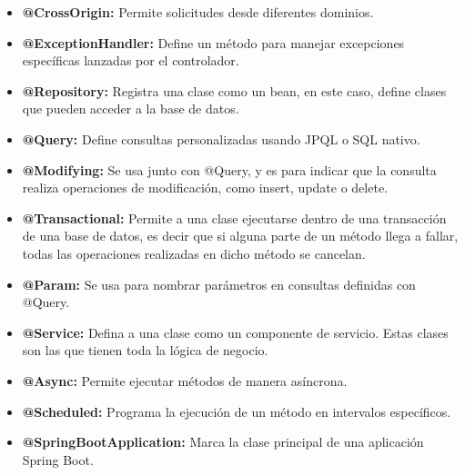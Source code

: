 \begin{itemize}
	\item \textbf{@CrossOrigin:} Permite solicitudes desde diferentes dominios. 
	\item \textbf{@ExceptionHandler:} Define un método para manejar excepciones específicas lanzadas por el controlador.
	\item \textbf{@Repository:} Registra una clase como un bean, en este caso, define clases que pueden acceder a la base de datos.
	\item \textbf{@Query:} Define consultas personalizadas usando JPQL o SQL nativo.
	\item \textbf{@Modifying:} Se usa junto con @Query, y es para indicar que la consulta realiza operaciones de modificación, como insert, update o delete.
	\item \textbf{@Transactional:} Permite a una clase ejecutarse dentro de una transacción de una base de datos, es decir que si alguna parte de un método llega a fallar, todas las operaciones realizadas en dicho método se cancelan.
	\item \textbf{@Param:} Se usa para nombrar parámetros en consultas definidas con @Query.
	\item \textbf{@Service:} Defina a una clase como un componente de servicio. Estas clases son las que tienen toda la lógica de negocio.
	\item \textbf{@Async:} Permite ejecutar métodos de manera asíncrona.
	\item \textbf{@Scheduled:} Programa la ejecución de un método en intervalos específicos.
	\item \textbf{@SpringBootApplication:} Marca la clase principal de una aplicación Spring Boot.
\end{itemize}